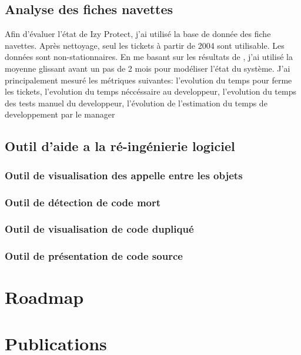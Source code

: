 \documentclass[a4paper]{article}
\begin{document}
\subsection{Analyse des fiches navettes}
\label{sec:analyseDesFichesNavettes}
Afin d'évaluer l'état de Izy Protect, j'ai utilisé la base de donnée des fiche navettes. 
Après nettoyage, seul les tickets à partir de 2004 sont utilisable. 
Les données sont non-stationnaires. 
En me basant sur les résultats de \cite{Raja09}, j'ai utilisé la moyenne glissant avant un pas de 2 mois pour modéliser l'état du système.
J'ai principalement mesuré les métriques suivantes: l'evolution du temps pour ferme les tickets, l'evolution du temps néccéssaire au developpeur, l'evolution du temps des tests manuel du developpeur,
l'évolution de l'estimation du temps de developpement par le manager

\subsection{Outil d'aide a la ré-ingénierie logiciel}

\subsubsection{Outil de visualisation des appelle entre les objets }

\subsubsection{Outil de détection de code mort}

\subsubsection{Outil de visualisation de code dupliqué}

\subsubsection{Outil de présentation de code source}

\section{Roadmap}
\label{sec:roadmap}

\section{Publications}
\end{document}

